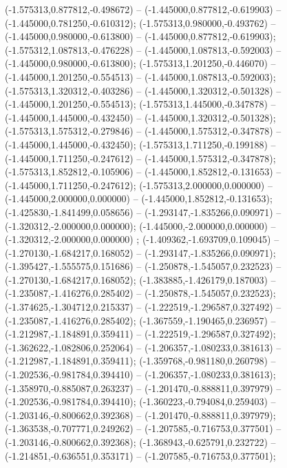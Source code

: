  (-1.575313,0.877812,-0.498672) -- (-1.445000,0.877812,-0.619903) -- (-1.445000,0.781250,-0.610312);
 (-1.575313,0.980000,-0.493762) -- (-1.445000,0.980000,-0.613800) -- (-1.445000,0.877812,-0.619903);
 (-1.575312,1.087813,-0.476228) -- (-1.445000,1.087813,-0.592003) -- (-1.445000,0.980000,-0.613800);
 (-1.575313,1.201250,-0.446070) -- (-1.445000,1.201250,-0.554513) -- (-1.445000,1.087813,-0.592003);
 (-1.575313,1.320312,-0.403286) -- (-1.445000,1.320312,-0.501328) -- (-1.445000,1.201250,-0.554513);
 (-1.575313,1.445000,-0.347878) -- (-1.445000,1.445000,-0.432450) -- (-1.445000,1.320312,-0.501328);
 (-1.575313,1.575312,-0.279846) -- (-1.445000,1.575312,-0.347878) -- (-1.445000,1.445000,-0.432450);
 (-1.575313,1.711250,-0.199188) -- (-1.445000,1.711250,-0.247612) -- (-1.445000,1.575312,-0.347878);
 (-1.575313,1.852812,-0.105906) -- (-1.445000,1.852812,-0.131653) -- (-1.445000,1.711250,-0.247612);
 (-1.575313,2.000000,0.000000) -- (-1.445000,2.000000,0.000000) -- (-1.445000,1.852812,-0.131653);
 (-1.425830,-1.841499,0.058656) -- (-1.293147,-1.835266,0.090971) -- (-1.320312,-2.000000,0.000000);
 (-1.445000,-2.000000,0.000000) -- (-1.320312,-2.000000,0.000000) ;
 (-1.409362,-1.693709,0.109045) -- (-1.270130,-1.684217,0.168052) -- (-1.293147,-1.835266,0.090971);
 (-1.395427,-1.555575,0.151686) -- (-1.250878,-1.545057,0.232523) -- (-1.270130,-1.684217,0.168052);
 (-1.383885,-1.426179,0.187003) -- (-1.235087,-1.416276,0.285402) -- (-1.250878,-1.545057,0.232523);
 (-1.374625,-1.304712,0.215337) -- (-1.222519,-1.296587,0.327492) -- (-1.235087,-1.416276,0.285402);
 (-1.367559,-1.190465,0.236957) -- (-1.212987,-1.184891,0.359411) -- (-1.222519,-1.296587,0.327492);
 (-1.362622,-1.082806,0.252064) -- (-1.206357,-1.080233,0.381613) -- (-1.212987,-1.184891,0.359411);
 (-1.359768,-0.981180,0.260798) -- (-1.202536,-0.981784,0.394410) -- (-1.206357,-1.080233,0.381613);
 (-1.358970,-0.885087,0.263237) -- (-1.201470,-0.888811,0.397979) -- (-1.202536,-0.981784,0.394410);
 (-1.360223,-0.794084,0.259403) -- (-1.203146,-0.800662,0.392368) -- (-1.201470,-0.888811,0.397979);
 (-1.363538,-0.707771,0.249262) -- (-1.207585,-0.716753,0.377501) -- (-1.203146,-0.800662,0.392368);
 (-1.368943,-0.625791,0.232722) -- (-1.214851,-0.636551,0.353171) -- (-1.207585,-0.716753,0.377501);
